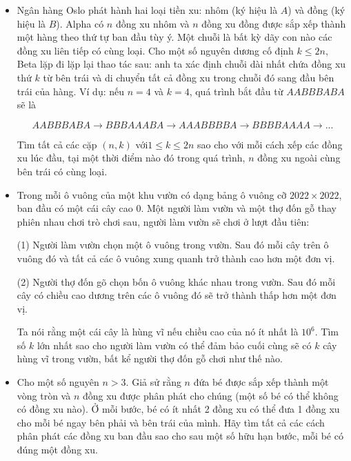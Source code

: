 \documentclass[11pt]{scrartcl}
\begin{document}
\begin{itemize}[label=, leftmargin=0em, itemsep=0.5em]
    
    \item\begin{btvn} Ngân hàng Oslo phát hành hai loại tiền xu: nhôm (ký hiệu là $A$) và đồng (ký hiệu là $B$). Alpha có $n$ đồng xu nhôm và $n$ đồng xu đồng được sắp xếp thành một hàng theo thứ tự ban đầu tùy ý. Một chuỗi là bất kỳ dãy con nào các đồng xu liên tiếp có cùng loại. Cho một số nguyên dương cố định $k \leq 2n$, Beta lặp đi lặp lại thao tác sau: anh ta xác định chuỗi dài nhất chứa đồng xu thứ $k$ từ bên trái và di chuyển tất cả đồng xu trong chuỗi đó sang đầu bên trái của hàng. Ví dụ: nếu $n=4$ và $k=4$, quá trình bắt đầu từ $AABBBABA$ sẽ là

        \[AABBBABA \to BBBAAABA \to AAABBBBA \to BBBBAAAA \to ...\]
        
        Tìm tất cả các cặp $(n,k)$ với$ 1 \leq k \leq 2n$ sao cho với mỗi cách xếp các đồng xu lúc đầu, tại một thời điểm nào đó trong quá trình, $n$ đồng xu ngoài cùng bên trái có cùng loại.
    \end{btvn}

    \item\begin{btvn} Trong mỗi ô vuông của một khu vườn có dạng bảng ô vuông cỡ $2022 \times 2022$, ban đầu có một cái cây cao $0$. Một người làm vườn và một thợ đốn gỗ thay phiên nhau chơi trò chơi sau, người làm vườn sẽ chơi ở lượt đầu tiên:

        (1) Người làm vườn chọn một ô vuông trong vườn. Sau đó mỗi cây trên ô vuông đó và tất cả các ô vuông xung quanh trở thành cao hơn một đơn vị.
        
        (2) Người thợ đốn gõ chọn bốn ô vuông khác nhau trong vườn. Sau đó mỗi cây có chiều cao dương trên các ô vuông đó sẽ trở thành thấp hơn một đơn vị.
        
        Ta nói rằng một cái cây là hùng vĩ nếu chiều cao của nó ít nhất là $10^6$. Tìm số $k$ lớn nhất sao cho người làm vườn có thể đảm bảo cuối cùng sẽ có $k$ cây hùng vĩ trong vườn, bất kể người thợ đốn gỗ chơi như thế nào.
    \end{btvn}
    
    \item\begin{btvn} Cho một số nguyên $n > 3$. Giả sử rằng $n$ đứa bé được sắp xếp thành một vòng tròn và $n$ đồng xu được phân phát cho chúng (một số bé có thể không có đồng xu nào). Ở mỗi bước, bé có ít nhất 2 đồng xu có thể đưa 1 đồng xu cho mỗi bé ngay bên phải và bên trái của mình. Hãy tìm tất cả các cách phân phát các đồng xu ban đầu sao cho sau một số hữu hạn bước, mỗi bé có đúng một đồng xu.
    \end{btvn}


\end{itemize}
\end{document}

